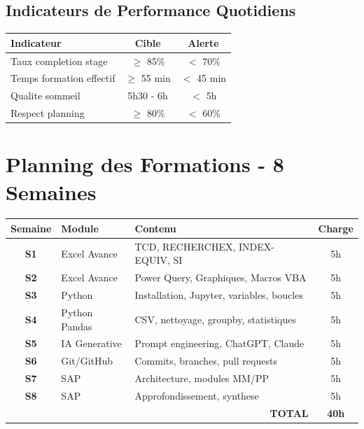 \documentclass[12pt,a4paper]{article}
\begin{document}
\subsection*{Indicateurs de Performance Quotidiens}

\begin{table}[h]
\centering
\begin{tabular}{|l|c|c|}
\hline
\rowcolor{gray!20}
\textbf{Indicateur} & \textbf{Cible} & \textbf{Alerte} \\
\hline
Taux completion stage & $\ge$ 85\% & $<$ 70\% \\
Temps formation effectif & $\ge$ 55 min & $<$ 45 min \\
Qualite sommeil & 5h30 - 6h & $<$ 5h \\
Respect planning & $\ge$ 80\% & $<$ 60\% \\
\hline
\end{tabular}
\end{table}

\newpage

\section{Planning des Formations - 8 Semaines}

\begin{table}[h]
\centering
\begin{tabular}{|c|p{3.2cm}|p{5.5cm}|c|}
\hline
\rowcolor{gray!20}
\textbf{Semaine} & \textbf{Module} & \textbf{Contenu} & \textbf{Charge} \\
\hline
\textbf{S1} & Excel Avance & TCD, RECHERCHEX, INDEX-EQUIV, SI & 5h \\
\textbf{S2} & Excel Avance & Power Query, Graphiques, Macros VBA & 5h \\
\textbf{S3} & Python & Installation, Jupyter, variables, boucles & 5h \\
\textbf{S4} & Python Pandas & CSV, nettoyage, groupby, statistiques & 5h \\
\textbf{S5} & IA Generative & Prompt engineering, ChatGPT, Claude & 5h \\
\textbf{S6} & Git/GitHub & Commits, branches, pull requests & 5h \\
\textbf{S7} & SAP & Architecture, modules MM/PP & 5h \\
\textbf{S8} & SAP & Approfondissement, synthese & 5h \\
\hline
\multicolumn{3}{|r|}{\textbf{TOTAL}} & \textbf{40h} \\
\hline
\end{tabular}
\end{table}
\end{document}
